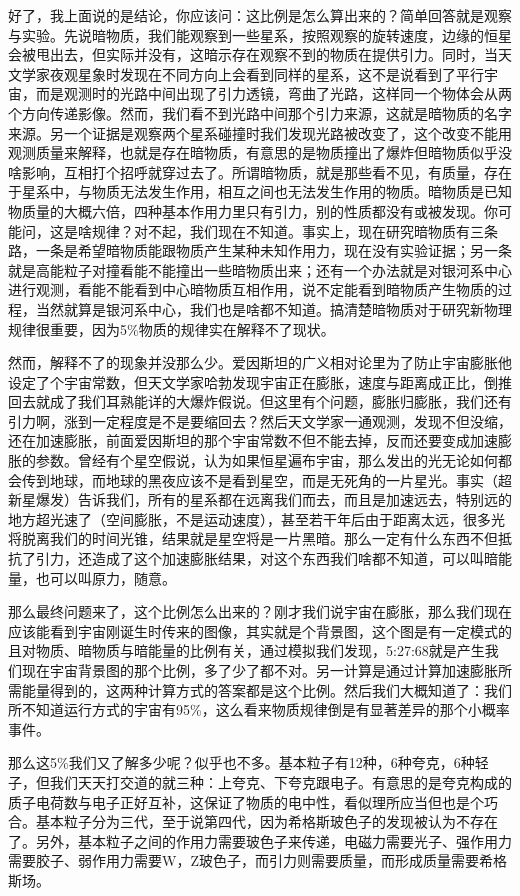 \documentclass[]{book}
\begin{document}
好了，我上面说的是结论，你应该问：这比例是怎么算出来的？简单回答就是观察与实验。先说暗物质，我们能观察到一些星系，按照观察的旋转速度，边缘的恒星会被甩出去，但实际并没有，这暗示存在观察不到的物质在提供引力。同时，当天文学家夜观星象时发现在不同方向上会看到同样的星系，这不是说看到了平行宇宙，而是观测时的光路中间出现了引力透镜，弯曲了光路，这样同一个物体会从两个方向传递影像。然而，我们看不到光路中间那个引力来源，这就是暗物质的名字来源。另一个证据是观察两个星系碰撞时我们发现光路被改变了，这个改变不能用观测质量来解释，也就是存在暗物质，有意思的是物质撞出了爆炸但暗物质似乎没啥影响，互相打个招呼就穿过去了。所谓暗物质，就是那些看不见，有质量，存在于星系中，与物质无法发生作用，相互之间也无法发生作用的物质。暗物质是已知物质量的大概六倍，四种基本作用力里只有引力，别的性质都没有或被发现。你可能问，这是啥规律？对不起，我们现在不知道。事实上，现在研究暗物质有三条路，一条是希望暗物质能跟物质产生某种未知作用力，现在没有实验证据；另一条就是高能粒子对撞看能不能撞出一些暗物质出来；还有一个办法就是对银河系中心进行观测，看能不能看到中心暗物质互相作用，说不定能看到暗物质产生物质的过程，当然就算是银河系中心，我们也是啥都不知道。搞清楚暗物质对于研究新物理规律很重要，因为5\%物质的规律实在解释不了现状。

然而，解释不了的现象并没那么少。爱因斯坦的广义相对论里为了防止宇宙膨胀他设定了个宇宙常数，但天文学家哈勃发现宇宙正在膨胀，速度与距离成正比，倒推回去就成了我们耳熟能详的大爆炸假说。但这里有个问题，膨胀归膨胀，我们还有引力啊，涨到一定程度是不是要缩回去？然后天文学家一通观测，发现不但没缩，还在加速膨胀，前面爱因斯坦的那个宇宙常数不但不能去掉，反而还要变成加速膨胀的参数。曾经有个星空假说，认为如果恒星遍布宇宙，那么发出的光无论如何都会传到地球，而地球的黑夜应该不是看到星空，而是无死角的一片星光。事实（超新星爆发）告诉我们，所有的星系都在远离我们而去，而且是加速远去，特别远的地方超光速了（空间膨胀，不是运动速度），甚至若干年后由于距离太远，很多光将脱离我们的时间光锥，结果就是星空将是一片黑暗。那么一定有什么东西不但抵抗了引力，还造成了这个加速膨胀结果，对这个东西我们啥都不知道，可以叫暗能量，也可以叫原力，随意。

那么最终问题来了，这个比例怎么出来的？刚才我们说宇宙在膨胀，那么我们现在应该能看到宇宙刚诞生时传来的图像，其实就是个背景图，这个图是有一定模式的且对物质、暗物质与暗能量的比例有关，通过模拟我们发现，5:27:68就是产生我们现在宇宙背景图的那个比例，多了少了都不对。另一计算是通过计算加速膨胀所需能量得到的，这两种计算方式的答案都是这个比例。然后我们大概知道了：我们所不知道运行方式的宇宙有95\%，这么看来物质规律倒是有显著差异的那个小概率事件。

那么这5\%我们又了解多少呢？似乎也不多。基本粒子有12种，6种夸克，6种轻子，但我们天天打交道的就三种：上夸克、下夸克跟电子。有意思的是夸克构成的质子电荷数与电子正好互补，这保证了物质的电中性，看似理所应当但也是个巧合。基本粒子分为三代，至于说第四代，因为希格斯玻色子的发现被认为不存在了。另外，基本粒子之间的作用力需要玻色子来传递，电磁力需要光子、强作用力需要胶子、弱作用力需要W，Z玻色子，而引力则需要质量，而形成质量需要希格斯场。
\end{document}
